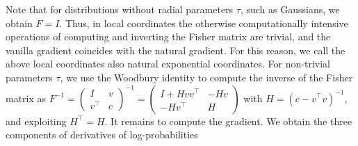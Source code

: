 Note that for distributions without radial parameters $\tau$, such as Gaussians, we obtain $F = I$. Thus, in local coordinates the otherwise computationally intensive operations of computing and inverting the Fisher matrix are trivial, and the vanilla gradient coincides with the natural gradient. For this reason, we call the above local coordinates also natural exponential coordinates. For non-trivial parameters $\tau$, we use the Woodbury identity to compute the inverse of the Fisher matrix as
$
F^{-1} = \begin{pmatrix}
I & v \\
v^\top & c
\end{pmatrix}^{-1} = \begin{pmatrix}
I + Hvv^\top & -Hv \\
-Hv^\top & H
\end{pmatrix}
$
with $H = (c - v^\top v)^{-1}$, and exploiting $H^\top = H$. It remains to compute the gradient. We obtain the three components of derivatives of log-probabilities
